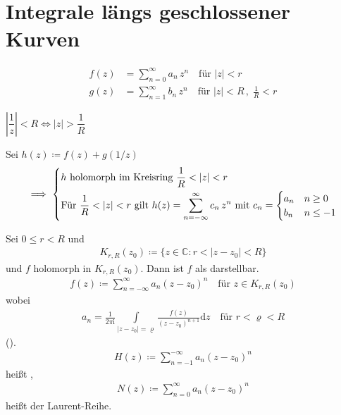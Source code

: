\documentclass[a4paper,10pt]{scrbook}
\begin{document}
\section{Integrale längs geschlossener Kurven}
\addtocounter{thmn}{1}
\setcounter{theorem}{0}


\begin{example}
  \begin{align*}
    f(z) &= \sum\limits_{n=0}^{\infty} a_n \, z^n \quad \text{für } |z| < r \\
    g(z) &= \sum\limits_{n=1}^{\infty} b_n \, z^n \quad \text{für } |z| < R \, , \; \frac{1}{R} < r
  \end{align*}
  \begin{notice*}[Nebenrechnung:]
    $\left| \dfrac{1}{z} \right| < R \iff |z| > \dfrac{1}{R}$
  \end{notice*}
  Sei $h(z) \coloneq f(z) + g(1/z)$
  \begin{align*}
    \implies
    \begin{dcases}
      h \text{ holomorph im Kreisring } \frac{1}{R} < |z| < r \\
      \text{Für } \frac{1}{R} < |z| < r \text{ gilt } h(z) = \sum\limits_{n=-\infty}^{\infty} c_n \, z^n
      \text{ mit } c_n =
      \begin{cases}
        a_n & n \geq 0 \\
        b_n & n \leq -1
      \end{cases}
    \end{dcases}
  \end{align*}
\end{example}

\begin{theorem}  \label{thm:4.2}
  Sei $0 \leq r < R$ und
  \begin{align*}
    K_{r,R}(z_0) \coloneq \{ z \in \mathbb{C} : r < |z-z_0| < R \}
  \end{align*}
  und $f$ holomorph in $K_{r,R}(z_0)$. Dann ist $f$ als  darstellbar.
  \begin{align*}
    f(z) \coloneq \sum\limits_{n=-\infty}^{\infty} a_n (z-z_0)^n \quad \text{für } z \in K_{r,R}(z_0)
  \end{align*}
  wobei
  \begin{align*}
    a_n = \frac{1}{2 \pi \mathrm{i}} \int\limits_{|z-z_0| = \varrho} \frac{f(z)}{(z-z_0)^{n+1}} \mathrm{d}z \quad \text{für } r < \varrho < R
  \end{align*}
  ().
  \begin{align*}
    H(z) \coloneq \sum\limits_{n=-1}^{-\infty} a_n (z-z_0)^n
  \end{align*}
  heißt ,
  \begin{align*}
    N(z) \coloneq \sum\limits_{n=0}^{\infty} a_n (z-z_0)^n
  \end{align*}
  heißt  der Laurent-Reihe.
\end{theorem}
\end{document}
